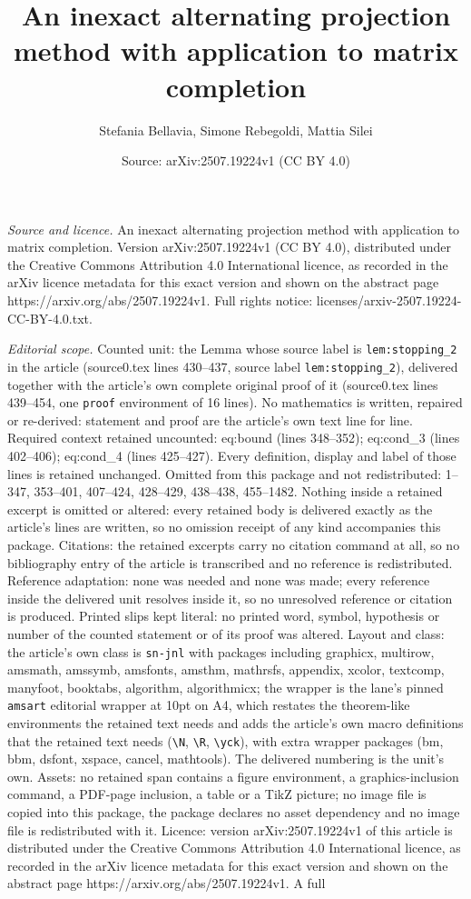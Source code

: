 \documentclass[10pt,a4paper]{amsart}
\title[An inexact alternating projection method with application to]{An inexact alternating projection method with application to matrix completion}
\author{Stefania Bellavia, Simone Rebegoldi, Mattia Silei}
\date{Source: arXiv:2507.19224v1 (CC BY 4.0)}
\begin{document}
\maketitle

\noindent\emph{Source and licence.} An inexact alternating projection method with application to matrix completion. Version arXiv:2507.19224v1 (CC BY 4.0), distributed under the Creative Commons Attribution 4.0 International licence, as recorded in the arXiv licence metadata for this exact version and shown on the abstract page https://arxiv.org/abs/2507.19224v1. Full rights notice: licenses/arxiv-2507.19224-CC-BY-4.0.txt.\par\smallskip

\noindent\textit{Editorial scope.} Counted unit: the Lemma whose source label is \texttt{lem:stopping\_2} in the article (source0.tex lines 430--437, source label \texttt{lem:stopping\_2}), delivered together with the article's own complete original proof of it (source0.tex lines 439--454, one \texttt{proof} environment of 16 lines). No mathematics is written, repaired or re-derived: statement and proof are the article's own text line for line. Required context retained uncounted: eq:bound (lines 348--352); eq:cond\_3 (lines 402--406); eq:cond\_4 (lines 425--427). Every definition, display and label of those lines is retained unchanged. Omitted from this package and not redistributed: 1--347, 353--401, 407--424, 428--429, 438--438, 455--1482. Nothing inside a retained excerpt is omitted or altered: every retained body is delivered exactly as the article's lines are written, so no omission receipt of any kind accompanies this package. Citations: the retained excerpts carry no citation command at all, so no bibliography entry of the article is transcribed and no reference is redistributed. Reference adaptation: none was needed and none was made; every reference inside the delivered unit resolves inside it, so no unresolved reference or citation is produced. Printed slips kept literal: no printed word, symbol, hypothesis or number of the counted statement or of its proof was altered. Layout and class: the article's own class is \texttt{sn-jnl} with packages including graphicx, multirow, amsmath, amssymb, amsfonts, amsthm, mathrsfs, appendix, xcolor, textcomp, manyfoot, booktabs, algorithm, algorithmicx; the wrapper is the lane's pinned \texttt{amsart} editorial wrapper at 10pt on A4, which restates the theorem-like environments the retained text needs and adds the article's own macro definitions that the retained text needs (\texttt{\textbackslash N}, \texttt{\textbackslash R}, \texttt{\textbackslash yck}), with extra wrapper packages (bm, bbm, dsfont, xspace, cancel, mathtools). The delivered numbering is the unit's own. Assets: no retained span contains a figure environment, a graphics-inclusion command, a PDF-page inclusion, a table or a TikZ picture; no image file is copied into this package, the package declares no asset dependency and no image file is redistributed with it. Licence: version arXiv:2507.19224v1 of this article is distributed under the Creative Commons Attribution 4.0 International licence, as recorded in the arXiv licence metadata for this exact version and shown on the abstract page https://arxiv.org/abs/2507.19224v1. A full 
\end{document}
